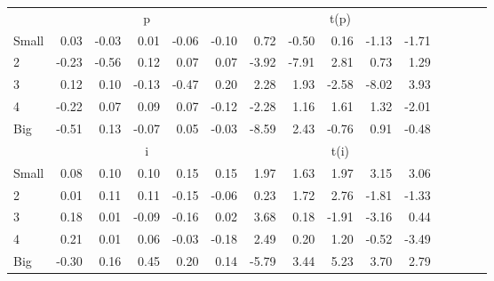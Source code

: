 \begin{table}[!ht]
\begin{tabular}{lrrrrrrrrrrrrrr}
      & \multicolumn{5}{c}{p} & \multicolumn{5}{c}{t(p)}
    
    \\
      \cmidrule(r){2-6} \cmidrule(r){7-11}

    Small   & 0.03  & -0.03  & 0.01  & -0.06  & -0.10  & 0.72  & -0.50  & 0.16  & -1.13  & -1.71  \\
         2  & -0.23  & -0.56  & 0.12  & 0.07  & 0.07  & -3.92  & -7.91  & 2.81  & 0.73  & 1.29  \\
         3  & 0.12  & 0.10  & -0.13  & -0.47  & 0.20  & 2.28  & 1.93  & -2.58  & -8.02  & 3.93  \\
         4  & -0.22  & 0.07  & 0.09  & 0.07  & -0.12  & -2.28  & 1.16  & 1.61  & 1.32  & -2.01  \\
    Big     & -0.51  & 0.13  & -0.07  & 0.05  & -0.03  & -8.59  & 2.43  & -0.76  & 0.91  & -0.48  \\

  
    
      & \multicolumn{5}{c}{i} & \multicolumn{5}{c}{t(i)}
    
    \\
      \cmidrule(r){2-6} \cmidrule(r){7-11}

    Small   & 0.08  & 0.10  & 0.10  & 0.15  & 0.15  & 1.97  & 1.63  & 1.97  & 3.15  & 3.06  \\
         2  & 0.01  & 0.11  & 0.11  & -0.15  & -0.06  & 0.23  & 1.72  & 2.76  & -1.81  & -1.33  \\
         3  & 0.18  & 0.01  & -0.09  & -0.16  & 0.02  & 3.68  & 0.18  & -1.91  & -3.16  & 0.44  \\
         4  & 0.21  & 0.01  & 0.06  & -0.03  & -0.18  & 2.49  & 0.20  & 1.20  & -0.52  & -3.49  \\
    Big     & -0.30  & 0.16  & 0.45  & 0.20  & 0.14  & -5.79  & 3.44  & 5.23  & 3.70  & 2.79  \\

  

  \bottomrule
\end{tabular}
\label{tbl:25_Size_NI_F16}
\end{table}